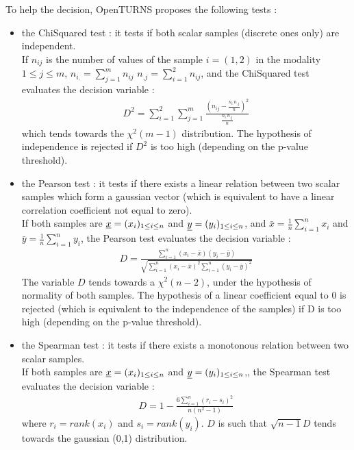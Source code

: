 To help the decision, OpenTURNS proposes the following tests :
\begin{itemize}
\item the ChiSquared test : it tests if both scalar samples (discrete ones only) are independent.\\
  If $n_{ij}$ is the number of values of the sample $i=(1,2)$ in the modality $1 \leq j \leq m$, $\displaystyle n_{i.} = \sum_{j=1}^m n_{ij}$ $\displaystyle n_{.j} = \sum_{i=1}^2 n_{ij}$, and the ChiSquared test evaluates the decision variable :
  \begin{align*}
    D^2 = \displaystyle \sum_{i=1}^2 \sum_{j=1}^m \frac{( n_{ij} - \frac{n_{i.} n_{.j}}{n} )^2}{\frac{n_{i.} n_{.j}}{n}}
  \end{align*}
  which tends towards the $\chi^2(m-1)$ distribution. The hypothesis of independence is rejected if $D^2$ is too high (depending on the p-value threshold).

\item the Pearson test : it tests if there exists a linear relation between two scalar samples which form a gaussian vector (which is equivalent to have a linear correlation coefficient not equal to zero). \\
  If both samples are ${\underline{x}} = (x_i)_{1 \leq i \leq n}$ and ${\underline{y}} = (y_i)_{1 \leq i \leq n}$, and $\bar{x} = \displaystyle \frac{1}{n}\sum_{i=1}^n x_i$ and $\bar{y} = \displaystyle \frac{1}{n}\sum_{i=1}^n y_i$, the Pearson test evaluates the decision variable :
  \begin{align*}
    D = \displaystyle \frac{\sum_{i=1}^n (x_i - \bar{x})(y_i - \bar{y})}{\sqrt{\sum_{i=1}^n (x_i - \bar{x})^2\sum_{i=1}^n (y_i - \bar{y})^2}}
  \end{align*}
  The variable $D$ tends towards a $\chi^2(n-2)$, under the hypothesis of normality of both samples. The hypothesis of a linear coefficient equal to 0 is rejected (which is equivalent to the independence of the samples) if D is too high (depending on the p-value threshold).

\item the Spearman test : it tests if there exists a monotonous relation between two scalar samples.\\
  If both samples are ${\underline{x}} = (x_i)_{1 \leq i \leq n}$ and ${\underline{y}}= (y_i)_{1 \leq i \leq n}$,, the Spearman test evaluates the decision variable :
  \begin{align*}
    D = \displaystyle 1-\frac{6\sum_{i=1}^n (r_i - s_i)^2}{n(n^2-1)}
  \end{align*}
  where $r_i = rank(x_i)$ and  $s_i = rank(y_i)$. $D$ is such that $\sqrt{n-1}D$ tends towards the gaussian (0,1) distribution.
\end{itemize}




